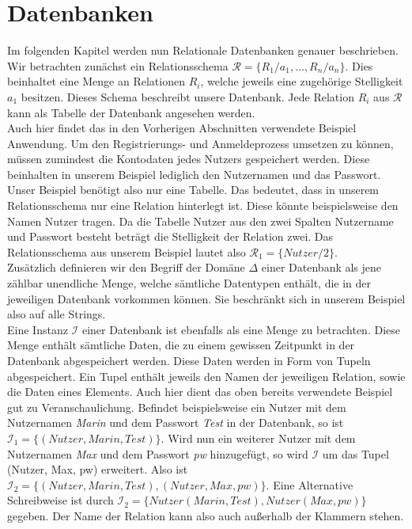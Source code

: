 \section{Datenbanken}
Im folgenden Kapitel werden nun Relationale Datenbanken genauer beschrieben. Wir betrachten zunächst ein Relationsschema  $\mathcal{R} = \{R_1/a_1,…,R_n/a_n\}$. Dies beinhaltet eine Menge an Relationen $R_i$, welche jeweils eine zugehörige Stelligkeit $a_1$ besitzen. Dieses Schema beschreibt unsere Datenbank. Jede Relation $R_i$ aus  $\mathcal{R}$ kann als Tabelle der Datenbank angesehen werden. \\
Auch hier findet das in den Vorherigen Abschnitten verwendete Beispiel Anwendung. Um den Registrierungs- und Anmeldeprozess umsetzen zu können, müssen zumindest die Kontodaten jedes Nutzers gespeichert werden. Diese beinhalten in unserem Beispiel lediglich den Nutzernamen und das Passwort. Unser Beispiel benötigt also nur eine Tabelle. Das bedeutet, dass in unserem Relationsschema nur eine Relation hinterlegt ist. Diese könnte beispielsweise den Namen Nutzer tragen. Da die Tabelle Nutzer aus den zwei Spalten Nutzername und Passwort besteht beträgt die Stelligkeit der Relation zwei. Das Relationsschema aus unserem Beispiel lautet also $\mathcal{R}_1=\{Nutzer/2\}$. \\
Zusätzlich definieren wir den Begriff der Domäne ${\Delta}$ einer Datenbank als jene zählbar unendliche Menge, welche sämtliche Datentypen enthält, die in der jeweiligen Datenbank vorkommen können. Sie beschränkt sich in unserem Beispiel also auf alle Strings. \\
Eine Instanz $\mathcal{I}$ einer Datenbank ist ebenfalls als eine Menge zu betrachten. Diese Menge enthält sämtliche Daten, die zu einem gewissen Zeitpunkt in der Datenbank abgespeichert werden. Diese Daten werden in Form von Tupeln abgespeichert. Ein Tupel enthält jeweils den Namen der jeweiligen Relation, sowie die Daten eines Elements. Auch hier dient das oben bereits verwendete Beispiel gut zu Veranschaulichung. Befindet beispielsweise ein Nutzer mit dem Nutzernamen \textit{Marin} und dem Passwort \textit{Test} in der Datenbank, so ist $\mathcal{I}_1 = \{(Nutzer, Marin, Test)\}$. Wird nun ein weiterer Nutzer mit dem Nutzernamen \textit{Max} und dem Passwort \textit{pw} hinzugefügt, so wird $\mathcal{I}$ um das Tupel (Nutzer, Max, pw) erweitert. Also ist $\mathcal{I}_2 =\{(Nutzer, Marin, Test), (Nutzer, Max, pw)\}$. Eine Alternative Schreibweise ist durch $\mathcal{I}_2 = \{Nutzer(Marin, Test), Nutzer(Max, pw)\}$ gegeben. Der Name der Relation kann also auch außerhalb der Klammern stehen.\\

